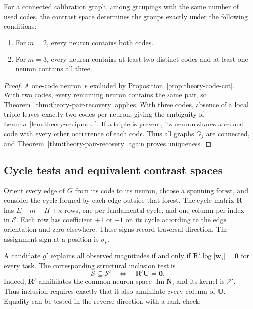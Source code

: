\begin{corollary}
    \label{cor:theory-small-budgets}
    For a connected calibration graph, among groupings with the
    same number of used codes, the contrast space determines the
    groups exactly under the following conditions:
    \begin{enumerate}
        \item For $m=2$, every neuron contains both codes.
        \item For $m=3$, every neuron contains at least two distinct
            codes and at least one neuron contains all three.
    \end{enumerate}
\end{corollary}

\begin{proof}
    A one-code neuron is excluded by
    Proposition~\ref{prop:theory-code-cut}.
    With two codes, every remaining neuron contains the same
    pair, so Theorem~\ref{thm:theory-pair-recovery} applies.
    With three codes, absence of a local triple leaves exactly
    two codes per neuron, giving the ambiguity of
    Lemma~\ref{lem:theory-reciprocal}.
    If a triple is present, its neuron shares a second code with
    every other occurrence of each code. Thus all graphs
    $G_j$ are connected, and
    Theorem~\ref{thm:theory-pair-recovery} again proves uniqueness.
\end{proof}

\subsection{Cycle tests and equivalent contrast spaces}
\label{app:theory-cycles}

Orient every edge of $G$ from its code to its neuron,
choose a spanning forest, and consider the cycle formed by each
edge outside that forest.
The cycle matrix $\mathbf R$ has $E-m-H+\kappa$ rows, one per
fundamental cycle, and one column per index in $\mathcal E$. Each row
has coefficient $+1$ or $-1$ on its cycle according to the edge
orientation and zero elsewhere. These signs record traversal
direction. The assignment sign at a position is $\sigma_p$.

A candidate $g'$ explains all observed magnitudes if and
only if $\mathbf R'\log|\mathbf w_\tau|=\mathbf0$
for every task. The corresponding structural inclusion test is
$$
    \mathcal S\subseteq\mathcal S'
       \quad\Longleftrightarrow\quad
       \mathbf R'\mathbf U=\mathbf0.
$$
Indeed, $\mathbf R'$ annihilates the common neuron
space $\operatorname{Im}\mathbf N$, and its kernel is
$\mathcal V'$. Thus inclusion requires exactly that
it also annihilate every column of $\mathbf U$.
Equality can be tested in the reverse direction with a rank check:

